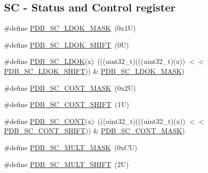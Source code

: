 \subsection*{SC -\/ Status and Control register}
\begin{DoxyCompactItemize}
\item 
\#define \mbox{\hyperlink{group___p_d_b___register___masks_gabe6a0c2a0e00e0d01b3b94ca8cd90728}{P\+D\+B\+\_\+\+S\+C\+\_\+\+L\+D\+O\+K\+\_\+\+M\+A\+SK}}~(0x1\+U)
\item 
\#define \mbox{\hyperlink{group___p_d_b___register___masks_ga8766bd357685d2ec463f51e0b08c6080}{P\+D\+B\+\_\+\+S\+C\+\_\+\+L\+D\+O\+K\+\_\+\+S\+H\+I\+FT}}~(0\+U)
\item 
\#define \mbox{\hyperlink{group___p_d_b___register___masks_gab33214a9a628b7e080eb9ef56efb8c4b}{P\+D\+B\+\_\+\+S\+C\+\_\+\+L\+D\+OK}}(x)~(((uint32\+\_\+t)(((uint32\+\_\+t)(x)) $<$$<$ \mbox{\hyperlink{group___p_d_b___register___masks_ga8766bd357685d2ec463f51e0b08c6080}{P\+D\+B\+\_\+\+S\+C\+\_\+\+L\+D\+O\+K\+\_\+\+S\+H\+I\+FT}})) \& \mbox{\hyperlink{group___p_d_b___register___masks_gabe6a0c2a0e00e0d01b3b94ca8cd90728}{P\+D\+B\+\_\+\+S\+C\+\_\+\+L\+D\+O\+K\+\_\+\+M\+A\+SK}})
\item 
\#define \mbox{\hyperlink{group___p_d_b___register___masks_gaa723ee73c65ba7680ef3c9de87b8a635}{P\+D\+B\+\_\+\+S\+C\+\_\+\+C\+O\+N\+T\+\_\+\+M\+A\+SK}}~(0x2\+U)
\item 
\#define \mbox{\hyperlink{group___p_d_b___register___masks_ga49a81fd7584f9957362d71ac5f4d12bb}{P\+D\+B\+\_\+\+S\+C\+\_\+\+C\+O\+N\+T\+\_\+\+S\+H\+I\+FT}}~(1\+U)
\item 
\#define \mbox{\hyperlink{group___p_d_b___register___masks_ga025ef364c34241696067cbe84797a343}{P\+D\+B\+\_\+\+S\+C\+\_\+\+C\+O\+NT}}(x)~(((uint32\+\_\+t)(((uint32\+\_\+t)(x)) $<$$<$ \mbox{\hyperlink{group___p_d_b___register___masks_ga49a81fd7584f9957362d71ac5f4d12bb}{P\+D\+B\+\_\+\+S\+C\+\_\+\+C\+O\+N\+T\+\_\+\+S\+H\+I\+FT}})) \& \mbox{\hyperlink{group___p_d_b___register___masks_gaa723ee73c65ba7680ef3c9de87b8a635}{P\+D\+B\+\_\+\+S\+C\+\_\+\+C\+O\+N\+T\+\_\+\+M\+A\+SK}})
\item 
\#define \mbox{\hyperlink{group___p_d_b___register___masks_ga86e3ec0c9f5ec6d0bbc1ebcf20774b38}{P\+D\+B\+\_\+\+S\+C\+\_\+\+M\+U\+L\+T\+\_\+\+M\+A\+SK}}~(0x\+C\+U)
\item 
\#define \mbox{\hyperlink{group___p_d_b___register___masks_gaaf1dfea7eddb56850efd85b75d659ef8}{P\+D\+B\+\_\+\+S\+C\+\_\+\+M\+U\+L\+T\+\_\+\+S\+H\+I\+FT}}~(2\+U)
\item 

\end{DoxyCompactItemize}
